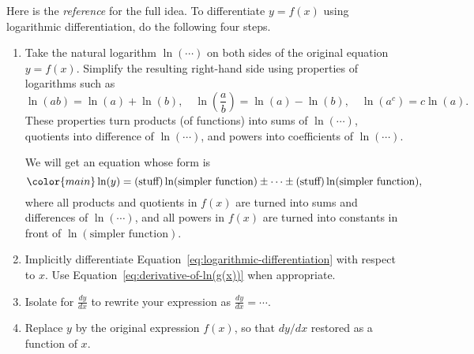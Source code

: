 \documentclass[../main.tex]{subfiles}
\begin{document}
  Here is the \emph{reference} for the full idea. To differentiate \(y = f(x)\) using logarithmic differentiation, do the following four steps.
  \begin{enumerate}
    \item Take the natural logarithm \(\ln(\cdots{})\) on both sides of the original equation \(y = f(x)\). Simplify the resulting right-hand side using properties of logarithms such as 
      \[
        \ln(ab) = \ln(a) + \ln(b), \quad \ln\left(\frac{a}{b}\right) = \ln(a) - \ln(b), \quad \ln(a^{c}) = c \ln(a). 
      \]
      These properties turn products (of functions) into sums of \(\ln(\cdots)\), quotients into difference of \(\ln(\cdots)\), and powers into coefficients of \(\ln(\cdots)\).

      We will get an equation whose form is 
      \begin{equation} \label{eq:logarithmic-differentiation}
        \color{main}
        \ln(y) = (\text{stuff})\ln( \text{simpler function} ) \pm \cdots \pm (\text{stuff})\ln( \text{simpler function} ),
      \end{equation}
      where all products and quotients in \(f(x)\) are turned into sums and differences of \(\ln(\cdots)\), and all powers in \(f(x)\) are turned into constants in front of \(\ln(\text{simpler function})\).


    \item Implicitly differentiate Equation~\eqref{eq:logarithmic-differentiation} with respect to \(x\). Use Equation~\eqref{eq:derivative-of-ln(g(x))} when appropriate.

    \item Isolate for \(\frac{dy}{dx}\) to rewrite your expression as \(\frac{dy}{dx} = \cdots\). 
    \item Replace \(y\) by the original expression \(f(x)\), so that \(dy/dx\) restored as a function of \(x\).
  \end{enumerate}
  \clearpage
\end{document}
